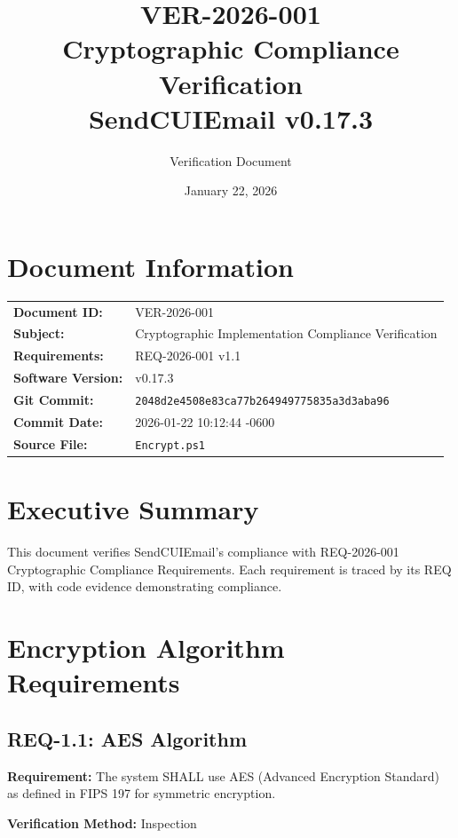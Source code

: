 \documentclass[11pt,letterpaper]{article}
\title{
    \textbf{VER-2026-001} \\
    \Large Cryptographic Compliance Verification \\
    \large SendCUIEmail v0.17.3
}
\author{Verification Document}
\date{January 22, 2026}
\begin{document}
\maketitle

\section*{Document Information}

\begin{tabular}{ll}
\textbf{Document ID:} & VER-2026-001 \\
\textbf{Subject:} & Cryptographic Implementation Compliance Verification \\
\textbf{Requirements:} & REQ-2026-001 v1.1 \\
\textbf{Software Version:} & v0.17.3 \\
\textbf{Git Commit:} & \texttt{2048d2e4508e83ca77b264949775835a3d3aba96} \\
\textbf{Commit Date:} & 2026-01-22 10:12:44 -0600 \\
\textbf{Source File:} & \texttt{Encrypt.ps1} \\
\end{tabular}

\section*{Executive Summary}

This document verifies SendCUIEmail's compliance with REQ-2026-001 Cryptographic Compliance Requirements. Each requirement is traced by its REQ ID, with code evidence demonstrating compliance.

\tableofcontents
\newpage

\section{Encryption Algorithm Requirements}

\subsection{REQ-1.1: AES Algorithm}

\textbf{Requirement:} The system SHALL use AES (Advanced Encryption Standard) as defined in FIPS 197 for symmetric encryption.

\textbf{Verification Method:} Inspection
\end{document}
